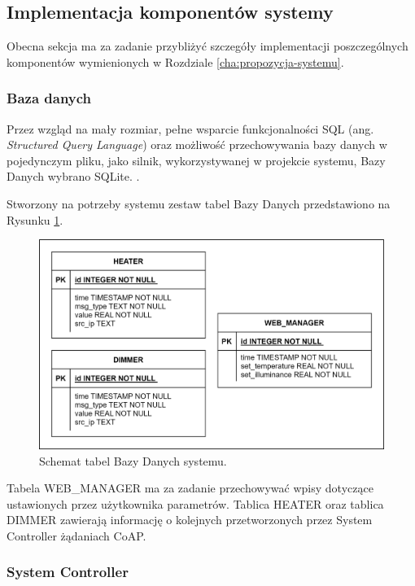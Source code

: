     \subsection{Implementacja komponentów systemy}

        Obecna sekcja ma za zadanie przybliżyć szczegóły implementacji poszczególnych komponentów wymienionych w Rozdziale \ref{cha:propozycja-systemu}.

        \subsubsection{Baza danych}
            Przez wzgląd na mały rozmiar, pełne wsparcie funkcjonalności SQL (ang. \textit{Structured Query Language}) oraz możliwość przechowywania bazy danych w pojedynczym pliku, jako silnik, wykorzystywanej w projekcie systemu, Bazy Danych wybrano SQLite. \cite{sqlite}.

            Stworzony na potrzeby systemu zestaw tabel Bazy Danych przedstawiono na Rysunku \ref{fig:db-diagram}.

            \begin{figure}[H]
                \centering
                \includegraphics[width=0.8\linewidth]{graphics/db_diagram.png}
                \caption{Schemat tabel Bazy Danych systemu.}
                \label{fig:db-diagram}
            \end{figure}

            Tabela WEB\_MANAGER ma za zadanie przechowywać wpisy dotyczące ustawionych przez użytkownika parametrów. Tablica HEATER oraz tablica DIMMER zawierają informację o kolejnych przetworzonych przez System Controller żądaniach CoAP.
    
        \subsubsection{System Controller}
    
